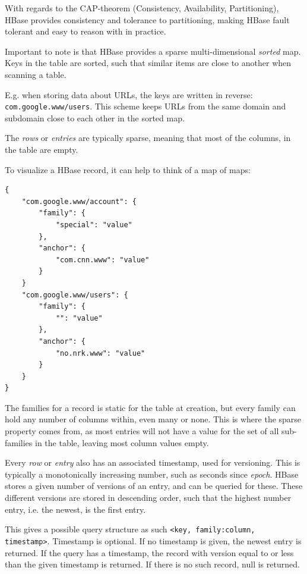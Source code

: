With regards to the CAP-theorem (Consistency, Availability, Partitioning), HBase provides consistency and tolerance to partitioning, making HBase fault tolerant and easy to reason with in practice.

Important to note is that HBase provides a sparse multi-dimensional \emph{sorted} map.
Keys in the table are sorted, such that similar items are close to another when scanning a table.

E.g. when storing data about URLs, the keys are written in reverse: \texttt{com.google.www/users}. This scheme keeps URLs from the same domain and subdomain close to each other in the sorted map.

The \emph{rows} or \emph{entries} are typically sparse, meaning that most of the columns, in the table are empty.

To visualize a HBase record, it can help to think of a map of maps:

\begin{lstlisting}[style=customc, caption=A JSON approach to visualize how rows in HBase are structured. Idea courtesy of Jim R. Wilson\cite{jimbojw}.]
{
	"com.google.www/account": {
		"family": {
			"special": "value"
		},
		"anchor": {
			"com.cnn.www": "value"
		}
	}
	"com.google.www/users": {
		"family": {
			"": "value"
		},
		"anchor": {
			"no.nrk.www": "value"
		}
	}
}
\end{lstlisting}

The families for a record is static for the table at creation, but every family can hold any number of columns within, even many or none.
This is where the sparse property comes from, as most entries will not have a value for the set of all sub-families in the table, leaving most column values empty.

Every \emph{row} or \emph{entry} also has an associated timestamp, used for versioning. This is typically a monotonically increasing number, such as seconds since \emph{epoch}. HBase stores a given number of versions of an entry, and can be queried for these. 
These different versions are stored in descending order, such that the highest number entry, i.e. the newest, is the first entry.

This gives a possible query structure as such \texttt{<key, family:column, timestamp>}. Timestamp is optional. If no timestamp is given, the newest entry is returned. 
If the query has a timestamp, the record with version equal to or less than the given timestamp is returned. If there is no such record, null is returned.

